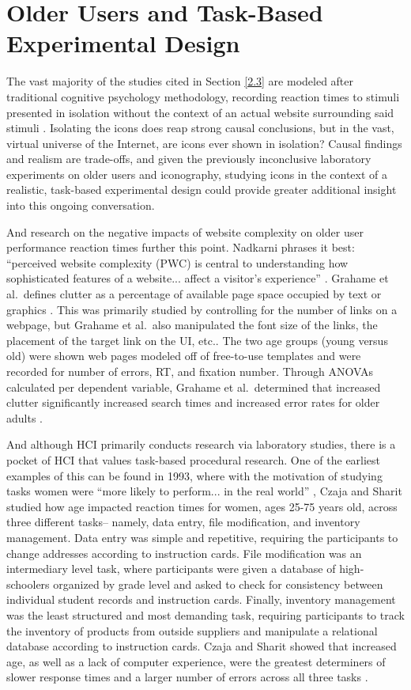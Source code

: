 \documentclass[12pt,twoside]{reedthesis}
\begin{document}
\section{Older Users and Task-Based Experimental Design}\label{2.4}
    The vast majority of the studies cited in Section \ref{2.3} are modeled after traditional cognitive psychology methodology, recording reaction times to stimuli presented in isolation without the context of an actual website surrounding said stimuli \cite{stephanidis_seven_2019}. Isolating the icons does reap strong causal conclusions, but in the vast, virtual universe of the Internet, are icons ever shown in isolation? Causal findings and realism are trade-offs, and given the previously inconclusive laboratory experiments on older users and iconography, studying icons in the context of a realistic, task-based experimental design could provide greater additional insight into this ongoing conversation.

    And research on the negative impacts of website complexity on older user performance reaction times further this point. Nadkarni phrases it best: \enquote{perceived website complexity (PWC) is central to understanding how sophisticated features of a website... affect a visitor's experience} \cite{nadkarni_task-based_2007}. Grahame et al.~defines clutter as a percentage of available page space occupied by text or graphics \cite{grahame_age_2004}. This was primarily studied by controlling for the number of links on a webpage, but Grahame et al.~also manipulated the font size of the links, the placement of the target link on the UI, etc.. The two age groups (young versus old) were shown web pages modeled off of free-to-use templates and were recorded for number of errors, RT, and fixation number. Through ANOVAs calculated per dependent variable, Grahame et al.~determined that increased clutter significantly increased search times and increased error rates for older adults \cite{grahame_age_2004}. 

    And although HCI primarily conducts research via laboratory studies, there is a pocket of HCI that values task-based procedural research. One of the earliest examples of this can be found in 1993, where with the motivation of studying tasks women were \enquote{more likely to perform... in the real world} \cite{czaja_age_1993}, Czaja and Sharit studied how age impacted reaction times for women, ages 25-75 years old, across three different tasks-- namely, data entry, file modification, and inventory management. Data entry was simple and repetitive, requiring the participants to change addresses according to instruction cards. File modification was an intermediary level task, where participants were given a database of high-schoolers organized by grade level and asked to check for consistency between individual student records and instruction cards. Finally, inventory management was the least structured and most demanding task, requiring participants to track the inventory of products from outside suppliers and manipulate a relational database according to instruction cards. Czaja and Sharit showed that increased age, as well as a lack of computer experience, were the greatest determiners of slower response times and a larger number of errors across all three tasks \cite{czaja_age_1993}. 
    
\end{document}
